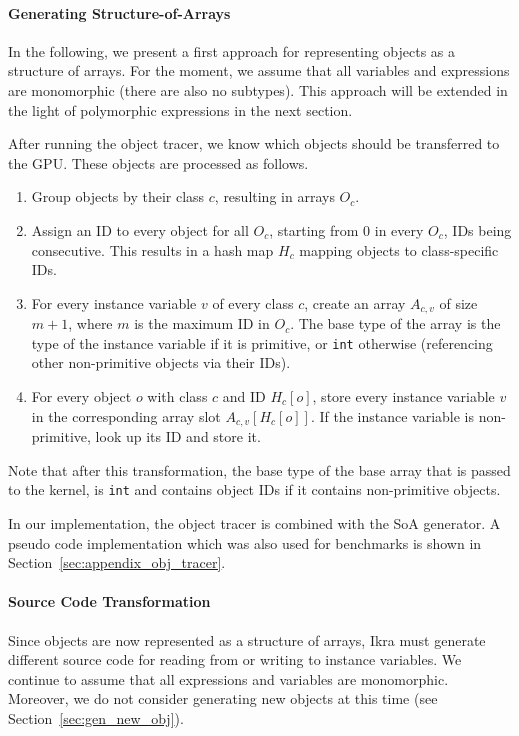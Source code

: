 \documentclass[preprint]{sigplanconf}
\begin{document}
\paragraph{Generating Structure-of-Arrays}
In the following, we present a first approach for representing objects as a structure of arrays. For the moment, we assume that all variables and expressions are monomorphic (there are also no subtypes). This approach will be extended in the light of polymorphic expressions in the next section.

After running the object tracer, we know which objects should be transferred to the GPU. These objects are processed as follows.
\begin{enumerate}
    \item Group objects by their class $c$, resulting in arrays $O_c$.
    \item Assign an ID to every object for all $O_c$, starting from $0$ in every $O_c$, IDs being consecutive. This results in a hash map $H_c$ mapping objects to class-specific IDs.
    \item For every instance variable $v$ of every class $c$, create an array $A_{c,v}$ of size $m + 1$, where $m$ is the maximum ID in $O_c$. The base type of the array is the type of the instance variable if it is primitive, or \texttt{int} otherwise (referencing other non-primitive objects via their IDs).
    \item For every object $o$ with class $c$ and ID $H_c[o]$, store every instance variable $v$ in the corresponding array slot $A_{c, v}[H_c[o]]$. If the instance variable is non-primitive, look up its ID and store it.
\end{enumerate}

Note that after this transformation, the base type of the base array that is passed to the kernel, is \texttt{int} and contains object IDs if it contains non-primitive objects.

In our implementation, the object tracer is combined with the SoA generator. A pseudo code implementation which was also used for benchmarks is shown in Section~\ref{sec:appendix_obj_tracer}.

\paragraph{Source Code Transformation}
Since objects are now represented as a structure of arrays, Ikra must generate different source code for reading from or writing to instance variables. We continue to assume that all expressions and variables are monomorphic. Moreover, we do not consider generating new objects at this time (see Section~\ref{sec:gen_new_obj}).
\end{document}
